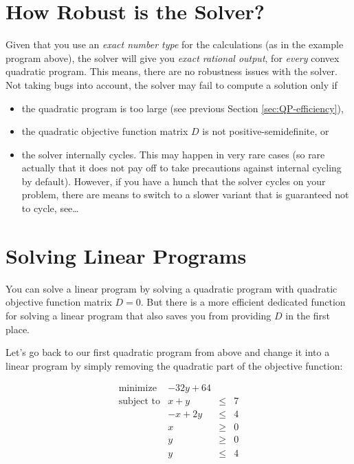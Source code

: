 \section{How Robust is the Solver?}
Given that you use an \emph{exact number type} for the 
calculations (as in the example program above), the solver
will give you \emph{exact rational output}, for \emph{every}
convex quadratic program. This means, there are no robustness
issues with the solver. Not taking bugs into account, the solver 
may fail to compute a solution only if
\begin{itemize}
\item the quadratic program is too large (see previous Section 
\ref{sec:QP-efficiency}), 
\item the quadratic objective function matrix $D$ is not 
positive-semidefinite, or
\item the solver internally cycles. This may happen in very rare
cases (so rare actually that it does not pay off to take
precautions against internal cycling by default). However, if
you have a hunch that the solver cycles on your problem,
there are means to switch to a slower variant that is guaranteed
not to cycle, see\ldots 
\end{itemize}

\section{Solving Linear Programs}\label{sec:QP-lp}
You can solve a linear program by solving a quadratic program with
quadratic objective function matrix $D=0$. But there is a more efficient
dedicated function for solving a linear program that also saves you
from providing $D$ in the first place. 

Let's go back to our first quadratic program from above and change it 
into a linear program by simply removing the quadratic part of the
objective function:

\[
\begin{array}{lrcl}
\mbox{minimize}       & - 32y + 64 \\
\mbox{subject to}     & x + y &\leq& 7 \\
                      & -x + 2y &\leq& 4 \\
                      & x &\geq& 0 \\
                      & y &\geq& 0 \\
                      & y &\leq& 4
\end{array}
\] 

